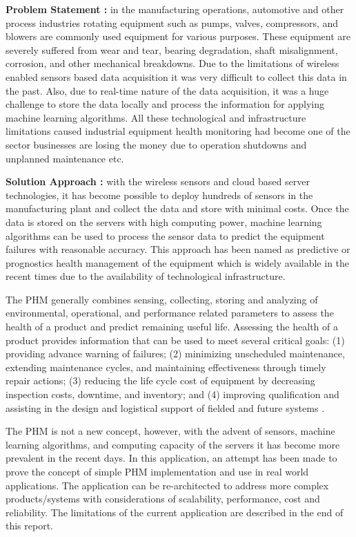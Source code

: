 \documentclass[sigconf]{acmart}
\begin{document}
\textbf{Problem Statement :} in the manufacturing operations, automotive and other process industries rotating equipment such as pumps, valves, compressors, and blowers are commonly used equipment for various purposes. These equipment are severely suffered from wear and tear, bearing degradation, shaft misalignment, corrosion, and other mechanical breakdowns. Due to the limitations of wireless enabled sensors based data acquisition it was very difficult to collect this data in the past. Also, due to real-time nature of the data acquisition, it was a huge challenge to store the data locally and process the information for applying machine learning algorithms. All these technological and infrastructure limitations caused industrial equipment health monitoring had become one of the sector businesses are losing the money due to operation shutdowns and unplanned maintenance etc.

\textbf{Solution Approach :} with the wireless sensors and cloud based server technologies, it has become possible to deploy hundreds of sensors in the manufacturing plant and collect the data and store with minimal costs. Once the data is stored on the servers with high computing power, machine learning algorithms can be used to process the sensor data to predict the equipment failures with reasonable accuracy. This approach has been named as predictive or prognostics health management of the equipment which is widely available in the recent times due to the availability of technological infrastructure.

The PHM generally combines sensing, collecting, storing and analyzing of environmental, operational, and performance related parameters to assess the health of a product and predict remaining useful life. Assessing the health of a product provides information that can be used to meet several critical goals: (1) providing advance warning of failures; (2) minimizing unscheduled maintenance, extending maintenance cycles, and maintaining effectiveness through timely repair actions; (3) reducing the life cycle cost of equipment by decreasing inspection costs, downtime, and inventory; and (4) improving qualification and assisting in the design and logistical support of fielded and future systems \cite{Shunfeng2010}.

The PHM is not a new concept, however, with the advent of sensors, machine learning algorithms, and computing capacity of the servers it has become more prevalent in the recent days. In this application, an attempt has been made to prove the concept of simple PHM implementation and use in real world applications. The application can be re-architected to address more complex products/systems with considerations of scalability, performance, cost and reliability. The limitations of the current application are described in the end of this report.
\end{document}
